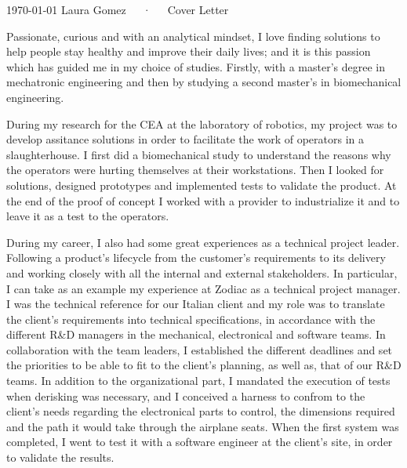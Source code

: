 \documentclass[11pt, a4paper]{awesome-cv}
\begin{document}
\makecvheader[R]

\makecvfooter
  {\today}
  {Laura Gomez~~~·~~~Cover Letter}
  {}

\makelettertitle

\begin{cvletter}


Passionate, curious and with an analytical mindset, I love finding solutions to help people stay healthy and improve their daily lives;
and it is this passion which has guided me in my choice of studies. Firstly, with a master's degree in mechatronic engineering and then by studying a second master's in biomechanical engineering. 

%
During my research for the CEA at the laboratory of robotics, my project was to develop assitance solutions in order to facilitate the work of operators in a slaughterhouse. 
I first did a biomechanical study to understand the reasons why the operators were hurting themselves at their workstations. Then I looked for solutions, designed prototypes and implemented tests to validate the product.
At the end of the proof of concept I worked with a provider to industrialize it and to leave it as a test to the operators.

During my career, I also had some great experiences as a technical project leader. 
Following a product's lifecycle from the customer's requirements to its delivery and working closely with all the internal and external stakeholders.
In particular, I can take as an example my experience at Zodiac as a technical project manager. 
I was the technical reference for our Italian client and my role was to translate the client's requirements into technical specifications, in accordance with the different R\&D managers in the mechanical, electronical and software teams.
In collaboration with the team leaders, I established the different deadlines and set the priorities to be able to fit to the client's planning, as well as, that of our R\&D teams.
In addition to the organizational part, I mandated the execution of tests when derisking was necessary, and I conceived a harness to confrom to the client's needs regarding the electronical parts to control, the dimensions required and the path it would take through the airplane seats.
When the first system was completed, I went to test it with a software engineer at the client's site, in order to validate the results.


\end{cvletter}
\end{document}
